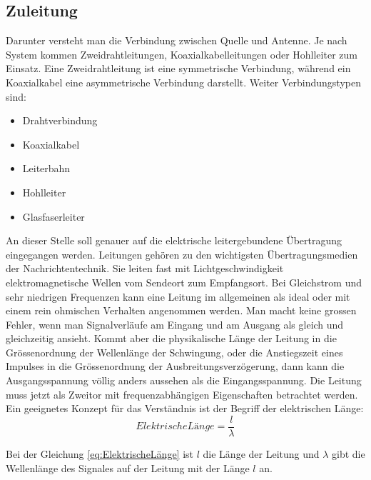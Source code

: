 \subsection{Zuleitung}
Darunter versteht man die Verbindung zwischen Quelle und Antenne. Je nach System kommen Zweidrahtleitungen, Koaxialkabelleitungen oder Hohlleiter zum Einsatz. Eine Zweidrahtleitung ist eine symmetrische Verbindung, während ein Koaxialkabel eine asymmetrische Verbindung darstellt.
Weiter Verbindungstypen sind:
\begin{itemize}
\item Drahtverbindung
\item Koaxialkabel
\item Leiterbahn
\item Hohlleiter
\item Glasfaserleiter
\end{itemize}
An dieser Stelle soll genauer auf die elektrische leitergebundene Übertragung eingegangen werden.
Leitungen gehören zu den wichtigsten Übertragungsmedien der Nachrichtentechnik. Sie leiten fast mit Lichtgeschwindigkeit elektromagnetische Wellen vom Sendeort zum Empfangsort.
Bei Gleichstrom und sehr niedrigen Frequenzen kann eine Leitung im allgemeinen als ideal oder mit einem rein ohmischen Verhalten angenommen werden. Man macht keine grossen Fehler, wenn man Signalverläufe am Eingang und am Ausgang als gleich und gleichzeitig ansieht. Kommt aber die physikalische Länge der Leitung in die Grössenordnung der Wellenlänge der Schwingung, oder die Anstiegszeit eines Impulses in die Grössenordnung der Ausbreitungsverzögerung, dann kann die Ausgangsspannung völlig anders aussehen als die Eingangsspannung. Die Leitung muss jetzt als Zweitor mit frequenzabhängigen Eigenschaften betrachtet werden.
Ein geeignetes Konzept für das Verständnis ist der Begriff der elektrischen Länge:
\begin{equation}
Elektrische Länge=\dfrac{l}{\lambda}\label{eq:ElektrischeLänge}
\end{equation}

Bei der  Gleichung \ref{eq:ElektrischeLänge} ist $l$ die Länge der Leitung und $\lambda$ gibt die Wellenlänge des Signales auf der Leitung mit der Länge $l$ an. 
			
